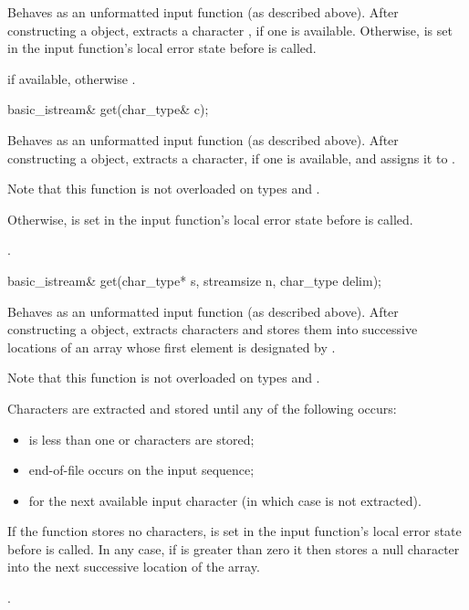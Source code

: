 \begin{itemdescr}
\pnum
\effects
Behaves as an unformatted input function
(as described above).
After constructing a  object, extracts
a character , if one is available.
Otherwise,
 is set in the input function's local error state
before  is called.

\pnum
\returns
{} if available,
otherwise
.
\end{itemdescr}

%
\begin{itemdecl}
basic_istream& get(char_type& c);
\end{itemdecl}

\begin{itemdescr}
\pnum
\effects
Behaves as an unformatted input function
(as described above).
After constructing a  object, extracts
a character, if one is available, and assigns it to .
\begin{footnote}
Note
that this function is not overloaded on types
and
.
\end{footnote}
Otherwise,
 is set in the input function's local error state
before  is called.

\pnum
\returns
{}.
\end{itemdescr}

%
\begin{itemdecl}
basic_istream& get(char_type* s, streamsize n, char_type delim);
\end{itemdecl}

\begin{itemdescr}
\pnum
\effects
Behaves as an unformatted input function
(as described above).
After constructing a  object, extracts
characters and stores them
into successive locations of an array whose first element is designated by
.
\begin{footnote}
Note that this function is not overloaded on types
and
.
\end{footnote}
Characters are extracted and stored until any of the following occurs:
\begin{itemize}
\item
{} is less than one or 
characters are stored;
\item
end-of-file occurs on the input sequence;
\item
{}
for the next available input
character 
(in which case  is not extracted).
\end{itemize}

\pnum
If the function stores no characters,
 is set in the input function's local error state
before  is called.
In any case, if  is greater than zero it then stores a null character
into the next successive location of the array.

\pnum
\returns
{}.
\end{itemdescr}

